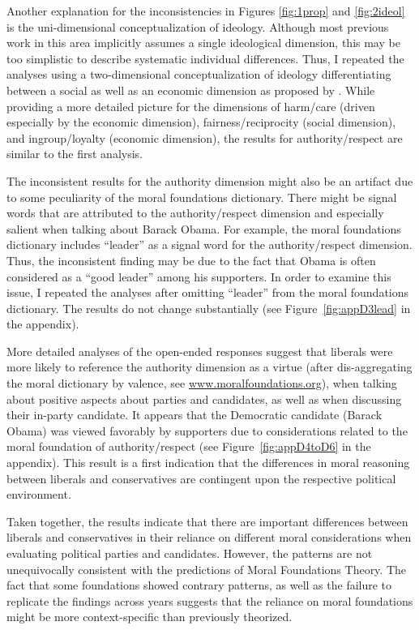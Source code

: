 \documentclass[12pt]{article}
\begin{document}
Another explanation for the inconsistencies in Figures \ref{fig:1prop} and \ref{fig:2ideol} is the uni-dimensional conceptualization of ideology. Although most previous work in this area implicitly assumes a single ideological dimension, this may be too simplistic to describe systematic individual differences. Thus, I repeated the analyses using a two-dimensional conceptualization of ideology differentiating between a social as well as an economic dimension as proposed by \citet[see Figure~\ref{fig:appD2soceco}]{feldman2014understanding}. While providing a more detailed picture for the dimensions of harm/care (driven especially by the economic dimension), fairness/reciprocity (social dimension), and ingroup/loyalty (economic dimension), the results for authority/respect are similar to the first analysis.

The inconsistent results for the authority dimension might also be an artifact due to some peculiarity of the moral foundations dictionary. There might be signal words that are attributed to the authority/respect dimension and especially salient when talking about Barack Obama. For example, the moral foundations dictionary includes ``leader'' as a signal word for the authority/respect dimension. Thus, the inconsistent finding may be due to the fact that Obama is often considered as a ``good leader'' among his supporters. In order to examine this issue, I repeated the analyses after omitting ``leader'' from the moral foundations dictionary. The results do not change substantially (see Figure~\ref{fig:appD3lead} in the appendix).

More detailed analyses of the open-ended responses suggest that liberals were more likely to reference the authority dimension as a virtue (after dis-aggregating the moral dictionary by valence, see \url{www.moralfoundations.org}), when talking about positive aspects about parties and candidates, as well as when discussing their in-party candidate. It appears that the Democratic candidate (Barack Obama) was viewed favorably by supporters due to considerations related to the moral foundation of authority/respect (see Figure~\ref{fig:appD4toD6} in the appendix). This result is a first indication that the differences in moral reasoning between liberals and conservatives are contingent upon the respective political environment.

Taken together, the results indicate that there are important differences between liberals and conservatives in their reliance on different moral considerations when evaluating political parties and candidates. However, the patterns are not unequivocally consistent with the predictions of Moral Foundations Theory. The fact that some foundations showed contrary patterns, as well as the failure to replicate the findings across years suggests that the reliance on moral foundations might be more context-specific than previously theorized.
\end{document}
